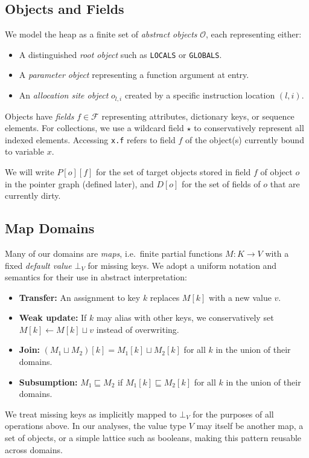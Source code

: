 \subsection{Objects and Fields}
We model the heap as a finite set of \emph{abstract objects} $\mathcal{O}$, each representing either:
\begin{itemize}
    \item A distinguished \emph{root object} such as \texttt{LOCALS} or \texttt{GLOBALS}.
    \item A \emph{parameter object} representing a function argument at entry.
    \item An \emph{allocation site object} $o_{l,i}$ created by a specific instruction location $(l, i)$.
\end{itemize}
Objects have \emph{fields} $f \in \mathcal{F}$ representing attributes, dictionary keys, or sequence elements.
For collections, we use a wildcard field $\star$ to conservatively represent all indexed elements.
Accessing \texttt{x.f} refers to field $f$ of the object(s) currently bound to variable $x$.

We will write $P[o][f]$ for the set of target objects stored in field $f$ of object $o$ in the pointer graph (defined later), and $D[o]$ for the set of fields of $o$ that are currently dirty.

\subsection{Map Domains}
Many of our domains are \emph{maps}, i.e.\ finite partial functions $M : K \to V$ with a fixed \emph{default value} $\bot_V$ for missing keys.
We adopt a uniform notation and semantics for their use in abstract interpretation:
\begin{itemize}
    \item \textbf{Transfer:} An assignment to key $k$ replaces $M[k]$ with a new value $v$.
    \item \textbf{Weak update:} If $k$ may alias with other keys, we conservatively set $M[k] \leftarrow M[k] \sqcup v$ instead of overwriting.
    \item \textbf{Join:} $(M_1 \sqcup M_2)[k] = M_1[k] \sqcup M_2[k]$ for all $k$ in the union of their domains.
    \item \textbf{Subsumption:} $M_1 \sqsubseteq M_2$ if $M_1[k] \sqsubseteq M_2[k]$ for all $k$ in the union of their domains.
\end{itemize}
We treat missing keys as implicitly mapped to $\bot_V$ for the purposes of all operations above.
In our analyses, the value type $V$ may itself be another map, a set of objects, or a simple lattice such as booleans, making this pattern reusable across domains.


